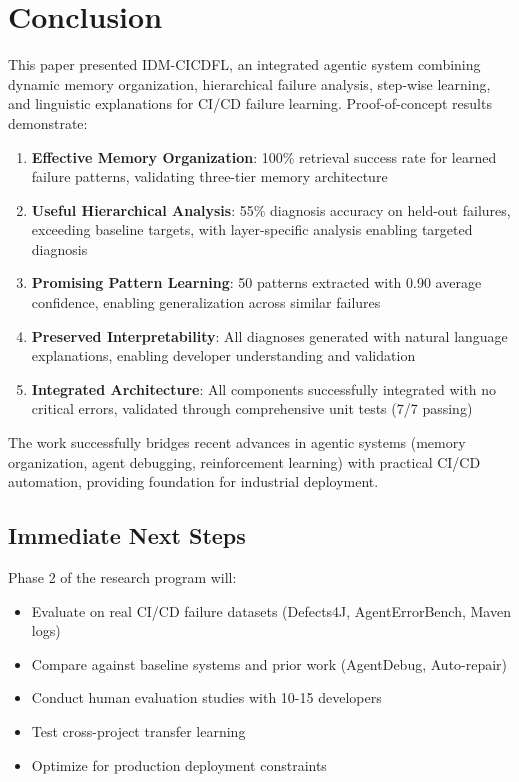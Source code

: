 \documentclass[11pt]{article}
\begin{document}
\section{Conclusion}

This paper presented IDM-CICDFL, an integrated agentic system combining dynamic memory organization, hierarchical failure analysis, step-wise learning, and linguistic explanations for CI/CD failure learning. Proof-of-concept results demonstrate:

\begin{enumerate}
    \item \textbf{Effective Memory Organization}: 100\% retrieval success rate for learned failure patterns, validating three-tier memory architecture
    
    \item \textbf{Useful Hierarchical Analysis}: 55\% diagnosis accuracy on held-out failures, exceeding baseline targets, with layer-specific analysis enabling targeted diagnosis
    
    \item \textbf{Promising Pattern Learning}: 50 patterns extracted with 0.90 average confidence, enabling generalization across similar failures
    
    \item \textbf{Preserved Interpretability}: All diagnoses generated with natural language explanations, enabling developer understanding and validation
    
    \item \textbf{Integrated Architecture}: All components successfully integrated with no critical errors, validated through comprehensive unit tests (7/7 passing)
\end{enumerate}

The work successfully bridges recent advances in agentic systems (memory organization, agent debugging, reinforcement learning) with practical CI/CD automation, providing foundation for industrial deployment.

\subsection{Immediate Next Steps}

Phase 2 of the research program will:
\begin{itemize}
    \item Evaluate on real CI/CD failure datasets (Defects4J, AgentErrorBench, Maven logs)
    \item Compare against baseline systems and prior work (AgentDebug, Auto-repair)
    \item Conduct human evaluation studies with 10-15 developers
    \item Test cross-project transfer learning
    \item Optimize for production deployment constraints
\end{itemize}
\end{document}
